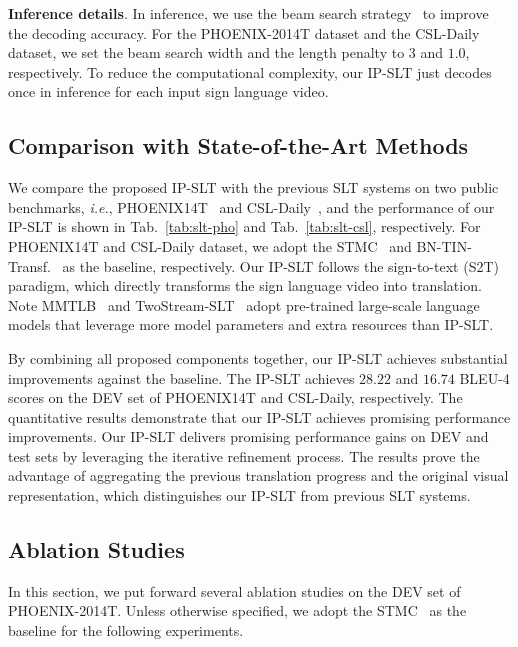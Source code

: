 \documentclass[10pt,twocolumn,letterpaper]{article}
\begin{document}
    \smallskip
    \noindent \textbf{Inference details}.
    In inference, we use the beam search strategy~\cite{wu2016google} to improve the decoding accuracy. 
    For the PHOENIX-2014T dataset and the CSL-Daily dataset, we set the beam search width and the length penalty to $3$ and $1.0$, respectively.
    To reduce the computational complexity, our IP-SLT just decodes once in inference for each input sign language video.


    \subsection{Comparison with State-of-the-Art Methods}
    We compare the proposed IP-SLT with the previous SLT systems on two public benchmarks, \emph{i.e.}, PHOENIX14T~\cite{camgoz2018neural} and CSL-Daily~\cite{zhou2021improving}, and the performance of our IP-SLT is shown in Tab.~\ref{tab:slt-pho} and Tab.~\ref{tab:slt-csl}, respectively. 
    For PHOENIX14T and CSL-Daily dataset, we adopt the STMC~\cite{zhou2021spatial} and BN-TIN-Transf.~\cite{zhou2021improving} as the baseline, respectively.
    Our IP-SLT follows the sign-to-text (S2T) paradigm, which directly transforms the sign language video into translation.
    Note MMTLB~\cite{chen2022simple} and TwoStream-SLT~\cite{chen2022two} adopt pre-trained large-scale language models that leverage more model parameters and extra resources than IP-SLT.

    By combining all proposed components together, our IP-SLT achieves substantial improvements against the baseline. 
    The IP-SLT achieves $28.22$ and $16.74$ BLEU-4 scores on the DEV set of PHOENIX14T and CSL-Daily, respectively. 
    The quantitative results demonstrate that our IP-SLT achieves promising performance improvements.
    Our IP-SLT delivers promising performance gains on DEV and test sets by leveraging the iterative refinement process. The results prove the advantage of aggregating the previous translation progress and the original visual representation, which distinguishes our IP-SLT from previous SLT systems.
    
    
    
    \subsection{Ablation Studies}
    In this section, we put forward several ablation studies on the DEV set of PHOENIX-2014T. Unless otherwise specified, we adopt the STMC~\cite{zhou2021spatial} as the baseline for the following experiments.
\end{document}
